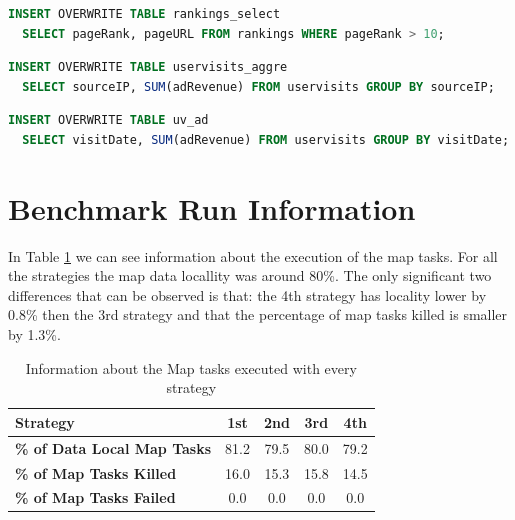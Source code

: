 \documentclass[11pt,a4paper,twoside]{report}
\begin{document}
\begin{lstlisting}[language=SQL, caption={Selects entries that have a page rank higher than 10}, label={lst:SelRank}]
INSERT OVERWRITE TABLE rankings_select
  SELECT pageRank, pageURL FROM rankings WHERE pageRank > 10;
\end{lstlisting}

\begin{lstlisting}[language=SQL, caption={Calculates ads revenue generated by each IP}, label={lst:AggUV}]
INSERT OVERWRITE TABLE uservisits_aggre
  SELECT sourceIP, SUM(adRevenue) FROM uservisits GROUP BY sourceIP;
\end{lstlisting}

\begin{lstlisting}[language=SQL, caption={Calculates ads revenue for each day}, label={lst:AdUV}]
INSERT OVERWRITE TABLE uv_ad
  SELECT visitDate, SUM(adRevenue) FROM uservisits GROUP BY visitDate;
\end{lstlisting}

\section{Benchmark Run Information}
In Table \ref{tab:LocalMaps} we can see information about the execution of the map tasks. For all the strategies the map data locallity was around 80\%. The only significant two differences that can be observed is that: the 4th strategy has locality lower by 0.8\% then the 3rd strategy and that the percentage of map tasks killed is smaller by 1.3\%.
\begin{table}[h]
\centering
\begin{tabular}{|l|c|c|c|c|}
\hline
\textbf{Strategy} & \textbf{1st} & \textbf{2nd} & \textbf{3rd} & \textbf{4th} \\ \hline
\textbf{\% of Data Local Map Tasks} & 81.2 & 79.5 & 80.0 & 79.2 \\ \hline
\textbf{\% of Map Tasks Killed} & 16.0 & 15.3 & 15.8 & 14.5 \\ \hline
\textbf{\% of Map Tasks Failed} & 0.0 & 0.0 & 0.0 & 0.0 \\ \hline
\end{tabular}
\caption{Information about the Map tasks executed with every strategy}
\label{tab:LocalMaps}
\end{table}
\end{document}
